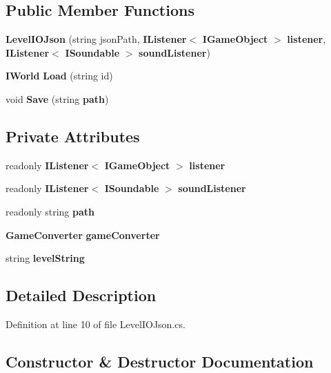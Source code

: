 \subsection*{Public Member Functions}
\begin{DoxyCompactItemize}
\item 
\textbf{ Level\+I\+O\+Json} (string json\+Path, \textbf{ I\+Listener}$<$ \textbf{ I\+Game\+Object} $>$ \textbf{ listener}, \textbf{ I\+Listener}$<$ \textbf{ I\+Soundable} $>$ \textbf{ sound\+Listener})
\item 
\textbf{ I\+World} \textbf{ Load} (string id)
\item 
void \textbf{ Save} (string \textbf{ path})
\end{DoxyCompactItemize}
\subsection*{Private Attributes}
\begin{DoxyCompactItemize}
\item 
readonly \textbf{ I\+Listener}$<$ \textbf{ I\+Game\+Object} $>$ \textbf{ listener}
\item 
readonly \textbf{ I\+Listener}$<$ \textbf{ I\+Soundable} $>$ \textbf{ sound\+Listener}
\item 
readonly string \textbf{ path}
\item 
\textbf{ Game\+Converter} \textbf{ game\+Converter}
\item 
string \textbf{ level\+String}
\end{DoxyCompactItemize}


\subsection{Detailed Description}


Definition at line 10 of file Level\+I\+O\+Json.\+cs.



\subsection{Constructor \& Destructor Documentation}
\mbox{\label{classMelloMario_1_1LevelGen_1_1JsonConverters_1_1LevelIOJson_a2e2efa1628d6af80e59d104e59a71eb6}} 
